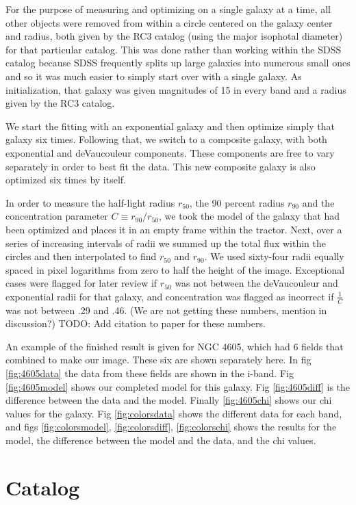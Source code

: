 \documentclass[12pt,preprint,pdftex]{aastex}
\newcommand{\rfifty}{r_{50}}
\newcommand{\rninety}{r_{90}}
\newcommand{\conc}{C}
\begin{document}
For the purpose of measuring and optimizing on a single galaxy at a
time, all other objects were removed from within a circle centered on
the galaxy center and radius, both given by the RC3 catalog (using the
major isophotal diameter) for that particular catalog. This was done
rather than working within the SDSS catalog because SDSS frequently
splits up large galaxies into numerous small ones and so it was much
easier to simply start over with a single galaxy. As initialization,
that galaxy was given magnitudes of 15 in every band and a radius
given by the RC3 catalog.

We start the fitting with an exponential galaxy and then optimize
simply that galaxy six times. Following that, we switch to a composite
galaxy, with both exponential and deVaucouleur components. These
components are free to vary separately in order to best fit the
data. This new composite galaxy is also optimized six times by itself.

In order to measure the half-light radius $\rfifty$, the 90 percent
radius $\rninety$ and the concentration parameter $\conc\equiv
\rninety/\rfifty$, we took the model of the galaxy that had been
optimized and places it in an empty frame within the tractor. Next,
over a series of increasing intervals of radii we summed up the total
flux within the circles and then interpolated to find $\rfifty$ and $\rninety$.
 We used sixty-four radii equally spaced in pixel logarithms from zero
 to half the height of the image. Exceptional cases were flagged for later
 review if $\rfifty$ was not between the deVaucouleur and exponential radii
 for that galaxy, and concentration was flagged as incorrect if $\frac{1}{\conc}$
 was not between .29 and .46. (We are not getting these numbers, mention in
 discussion?) TODO: Add citation to paper for these numbers.

An example of the finished result is given for NGC 4605, which had 6
fields that combined to make our image. These six are shown separately
here. In fig \ref{fig:4605data} the data from these fields are shown
in the i-band. Fig \ref{fig:4605model} shows our completed model for
this galaxy. Fig \ref{fig:4605diff} is the difference between the data
and the model. Finally \ref{fig:4605chi} shows our chi values for the
galaxy. Fig \ref{fig:colorsdata} shows the different data for each
band, and figs \ref{fig:colorsmodel}, \ref{fig:colorsdiff},
\ref{fig:colorschi} shows the results for the model, the difference
between the model and the data, and the chi values.

\section{Catalog}
\end{document}
